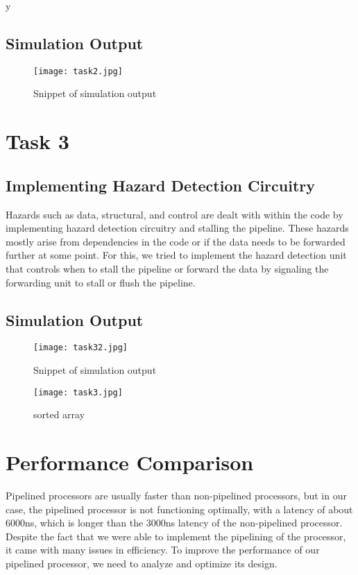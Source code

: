 y\documentclass[12pt]{article}
\begin{document}
\subsection{Simulation Output}\label{code2}
    \begin{figure}[htbp!]
        \centering
        \texttt{[image: task2.jpg]}
        \caption{Snippet of simulation output}
    \end{figure}

\section{Task 3}\label{task3}
\subsection{Implementing Hazard Detection Circuitry}\label{hazards}
    Hazards such as data, structural, and control are dealt with within the code by implementing hazard detection circuitry and stalling the pipeline. These hazards mostly arise from dependencies in the code or if the data needs to be forwarded further at some point. For this, we tried to implement the hazard detection unit that controls when to stall the pipeline or forward the data by signaling the forwarding unit to stall or flush the pipeline.

\newpage
\subsection{Simulation Output}\label{code3}

    \begin{figure}[htbp!]
        \centering
        \texttt{[image: task32.jpg]}
        \caption{Snippet of simulation output}
    \end{figure}
    \begin{figure}[htbp!]
        \centering
        \texttt{[image: task3.jpg]}
        \caption{sorted array}
    \end{figure}

\section{Performance Comparison}\label{performance}
    Pipelined processors are usually faster than non-pipelined processors, but in our case, the pipelined processor is not functioning optimally, with a latency of about 6000ns, which is longer than the 3000ns latency of the non-pipelined processor. Despite the fact that we were able to implement the pipelining of the processor, it came with many issues in efficiency. To improve the performance of our pipelined processor, we need to analyze and optimize its design.
\end{document}
